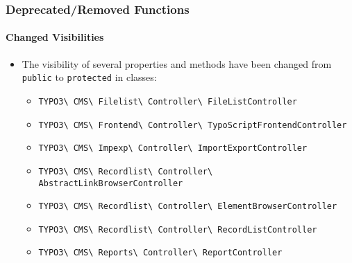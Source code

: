 
\begin{frame}[fragile]
	\frametitle{Deprecated/Removed Functions}
	\framesubtitle{Changed Visibilities}

	\begin{itemize}
		\item The visibility of several properties and methods have been changed
			from \texttt{public} to \texttt{protected} in classes:

			\begin{itemize}
				\smaller
				\item \texttt{TYPO3\textbackslash
						CMS\textbackslash
						Filelist\textbackslash
						Controller\textbackslash
						FileListController}

				\item \texttt{TYPO3\textbackslash
						CMS\textbackslash
						Frontend\textbackslash
						Controller\textbackslash
						TypoScriptFrontendController}

				\item \texttt{TYPO3\textbackslash
						CMS\textbackslash
						Impexp\textbackslash
						Controller\textbackslash
						ImportExportController}

				\item \texttt{TYPO3\textbackslash
						CMS\textbackslash
						Recordlist\textbackslash
						Controller\textbackslash
						AbstractLinkBrowserController}

				\item \texttt{TYPO3\textbackslash
						CMS\textbackslash
						Recordlist\textbackslash
						Controller\textbackslash
						ElementBrowserController}

				\item \texttt{TYPO3\textbackslash
						CMS\textbackslash
						Recordlist\textbackslash
						Controller\textbackslash
						RecordListController}

				\item \texttt{TYPO3\textbackslash
						CMS\textbackslash
						Reports\textbackslash
						Controller\textbackslash
						ReportController}


\end{itemize}
\end{itemize}
\end{frame}
